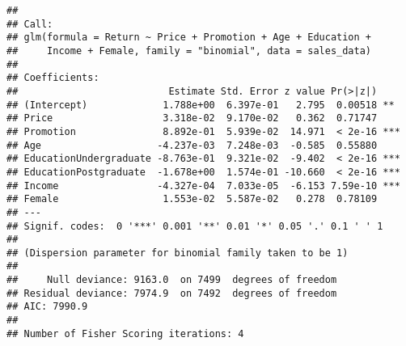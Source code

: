 \documentclass[
]{article}
\newenvironment{Shaded}{\begin{snugshade}}{\end{snugshade}}
\newcommand{\AttributeTok}[1]{\textcolor[rgb]{0.13,0.29,0.53}{#1}}
\newcommand{\CommentTok}[1]{\textcolor[rgb]{0.56,0.35,0.01}{\textit{#1}}}
\newcommand{\DecValTok}[1]{\textcolor[rgb]{0.00,0.00,0.81}{#1}}
\newcommand{\FunctionTok}[1]{\textcolor[rgb]{0.13,0.29,0.53}{\textbf{#1}}}
\newcommand{\NormalTok}[1]{#1}
\newcommand{\OtherTok}[1]{\textcolor[rgb]{0.56,0.35,0.01}{#1}}
\newcommand{\SpecialCharTok}[1]{\textcolor[rgb]{0.81,0.36,0.00}{\textbf{#1}}}
\newcommand{\StringTok}[1]{\textcolor[rgb]{0.31,0.60,0.02}{#1}}
\begin{document}
\begin{Shaded}
\end{Shaded}

\begin{verbatim}
## 
## Call:
## glm(formula = Return ~ Price + Promotion + Age + Education + 
##     Income + Female, family = "binomial", data = sales_data)
## 
## Coefficients:
##                          Estimate Std. Error z value Pr(>|z|)    
## (Intercept)             1.788e+00  6.397e-01   2.795  0.00518 ** 
## Price                   3.318e-02  9.170e-02   0.362  0.71747    
## Promotion               8.892e-01  5.939e-02  14.971  < 2e-16 ***
## Age                    -4.237e-03  7.248e-03  -0.585  0.55880    
## EducationUndergraduate -8.763e-01  9.321e-02  -9.402  < 2e-16 ***
## EducationPostgraduate  -1.678e+00  1.574e-01 -10.660  < 2e-16 ***
## Income                 -4.327e-04  7.033e-05  -6.153 7.59e-10 ***
## Female                  1.553e-02  5.587e-02   0.278  0.78109    
## ---
## Signif. codes:  0 '***' 0.001 '**' 0.01 '*' 0.05 '.' 0.1 ' ' 1
## 
## (Dispersion parameter for binomial family taken to be 1)
## 
##     Null deviance: 9163.0  on 7499  degrees of freedom
## Residual deviance: 7974.9  on 7492  degrees of freedom
## AIC: 7990.9
## 
## Number of Fisher Scoring iterations: 4
\end{verbatim}
\end{document}
